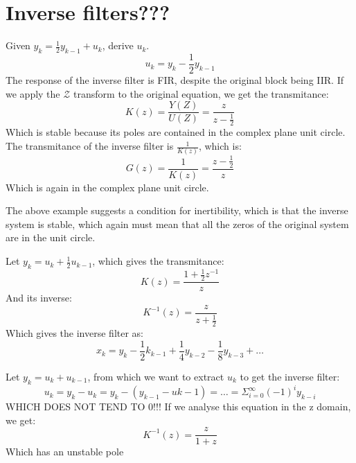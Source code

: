 \chapter{Inverse filters???}

\ex{}
{
    Given $y_k = \frac{1}{2}y_{k-1}+u_k$, derive $u_k$.
     \begin{equation}
         u_k = y_k - \frac{1}{2}y_{k-1}
    \end{equation}
    The response of the inverse filter is FIR, despite the original block
    being IIR.
    If we apply the $\mathcal{Z}$ transform to the original equation, we get the transmitance:
    \begin{equation}
        K(z) = \frac{Y(Z)}{U(Z)} = \frac{z}{z-\frac{1}{2}}
    \end{equation}
Which is stable because its poles are contained in the complex plane unit circle. The transmitance of the inverse filter is $\frac{1}{K(z)}$, which is:
\begin{equation}
    G(z) = \frac{1}{K(z)} = \frac{z-\frac{1}{2}}{z}
\end{equation}
Which is again in the complex plane unit circle.
}

The above example suggests a condition for inertibility, which is that the inverse system is stable, which again must mean that all the zeros of the original system are in the unit circle.

{
    Let $y_k = u_k+ \frac{1}{2}u_{k-1}$, which gives the transmitance:
    \begin{equation}
        K(z) = \frac{1+\frac{1}{2}z^{-1}}{z}
    \end{equation}
    And its inverse:
    \begin{equation}
        K^{-1}(z) = \frac{z}{z+\frac{1}{2}}
    \end{equation}
    Which gives the inverse filter as:
    \begin{equation}
        x_k = y_k-\frac{1}{2}k_{k-1}+\frac{1}{4}y_{k-2} - \frac{1}{8}y_{k-3} + \dots
    \end{equation}
}

{
    Let  $y_k = u_k + u_{k-1}$, from which we want to extract  $u_k$ to get the inverse filter:
     \begin{equation}
         u_k = y_k - u_k = y_k-(y_{k-1}-u{k-1}) = \dots = \Sigma_{i=0}^{\infty} (-1)^{i}y_{k-i}
    \end{equation}
    WHICH DOES NOT TEND TO 0!!!
    If we analyse this equation in the z domain, we get:
    \begin{equation}
        K^{-1}(z) = \frac{z}{1+z}
    \end{equation}
    Which has an unstable pole
}


